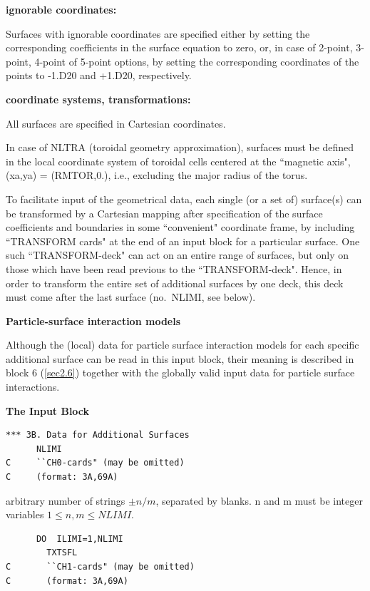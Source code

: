 \textbf{ignorable coordinates:} 

Surfaces with ignorable coordinates are specified either by setting the
corresponding coefficients in the surface equation to zero, or, in case of
2-point, 3-point, 4-point of 5-point options, by setting the corresponding
coordinates of the points to -1.D20 and +1.D20, respectively.
\smallskip

\textbf{coordinate systems, transformations:} 

All surfaces are specified in Cartesian coordinates.

In case of NLTRA (toroidal geometry approximation), surfaces must be defined in
the local coordinate system of toroidal cells centered at the ``magnetic axis",
(xa,ya) = (RMTOR,0.), i.e., excluding the major radius of the torus.

To facilitate input of the geometrical data, each single (or a set of)
surface(s) can be transformed by a Cartesian mapping after specification of the
surface coefficients and boundaries in some ``convenient" coordinate frame, by
including ``TRANSFORM cards" at the end of an input block for a particular
surface.
One such ``TRANSFORM-deck" can act on an entire range of surfaces, but only on
those which have been read previous to the ``TRANSFORM-deck".
Hence, in order to transform the entire set of additional surfaces by one deck,
this deck must come after the last surface (no.\ NLIMI, see below).

\textbf{Particle-surface interaction models} 

Although the (local) data for particle surface interaction models for each
specific additional surface can be read in this input block, their meaning is
described in block 6 (\cref{sec2.6}) together with the globally valid input
data for particle surface interactions.

\medskip

\textbf{The Input Block} 

\begin{lstlisting}
*** 3B. Data for Additional Surfaces
      NLIMI
C     ``CH0-cards" (may be omitted)
C     (format: 3A,69A)
\end{lstlisting} 

arbitrary number of strings $\pm n/m$, separated by blanks.
n and m
must be integer variables $1 \le n,m \le NLIMI$.

\begin{lstlisting}
      DO  ILIMI=1,NLIMI
        TXTSFL
C       ``CH1-cards" (may be omitted)
C       (format: 3A,69A)
\end{lstlisting}

